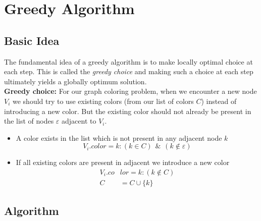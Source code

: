 \documentclass[14pt]{extreport}
\begin{document}
    	\pagebreak
	
	\chapter{Greedy Algorithm}
	
    	\section{Basic Idea}	
    		The fundamental idea of a greedy algorithm is to make locally optimal choice at each step. This is called the \textit{greedy choice} and making such a choice at each step ultimately yields a globally optimum solution. \vspace{20pt} \\
    		\textbf{Greedy choice:} For our graph coloring problem, when we encounter a new node $V_i$ we should try to use existing colors (from our list of colors $C$) instead of introducing a new color. But the existing color should not already be present in the list of nodes $\varepsilon$ adjacent to $V_i$. \vspace{20pt}
    		
    		\begin{itemize}
    			\item A color exists in the list which is not present in any adjacent node $k$
    			\begin{equation}
    			\label{eqn:1}
    			V_i.color = k : (k \in C) \hspace{5pt} \& \hspace{5pt} (k \not\in \varepsilon)
    			\end{equation}
    			
    			
    			\item If all existing colors are present in adjacent we introduce a new color
    			\begin{equation}
    			\begin{aligned}
        			\label{eqn:2}
        			V_i.co & lor = k : (k \not\in C) \\
    			    C & = C \cup \{k\}
    			\end{aligned}
    			\end{equation}
    		\end{itemize}
    	
    		\pagebreak
	
    	\section{Algorithm}
				
\end{document}
